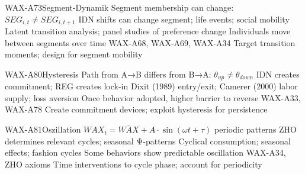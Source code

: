 
\begin{axiomspec}{WAX-A73}{Segment-Dynamik}
 Segment membership can change: $SEG_{i,t} \neq SEG_{i,t+1}$
 IDN shifts can change segment; life events; social mobility
 Latent transition analysis; panel studies of preference change
 Individuals move between segments over time
 WAX-A68, WAX-A69, WAX-A34
 Target transition moments; design for segment mobility
\end{axiomspec}


\begin{axiomspec}{WAX-A80}{Hysteresis}
 Path from A→B differs from B→A: $\theta_{up} \neq \theta_{down}$
 IDN creates commitment; REG creates lock-in
 Dixit (1989) entry/exit; Camerer (2000) labor supply; loss aversion
 Once behavior adopted, higher barrier to reverse
 WAX-A33, WAX-A78
 Create commitment devices; exploit hysteresis for persistence
\end{axiomspec}


\begin{axiomspec}{WAX-A81}{Oszillation}
 $WAX_t = \bar{WAX} + A \cdot \sin(\omega t + \tau)$ periodic patterns
 ZHO determines relevant cycles; seasonal Ψ-patterns
 Cyclical consumption; seasonal effects; fashion cycles
 Some behaviors show predictable oscillation
 WAX-A34, ZHO axioms
 Time interventions to cycle phase; account for periodicity
\end{axiomspec}


